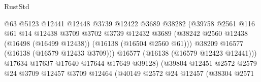 \begin{lexlean}{RustStd}
\begin{coremodule}
                                            @63
                                            @5123
                                            @12441
                                            @12448
                                            @3739
                                            @12422
                                            @3689
                                            @38282
                                            (@39758
                                              @2561
                                              @116
                                              @61
                                              @14
                                              @12438
                                              @3709
                                              @3702
                                              @3739
                                              @12432
                                              @3689
                                              (@38242
                                                @2560
                                                @12438
                                                (@16498 (@16499 @12438))
                                                (@16138 (@16504 @2560 @61)))
                                              @38209
                                              @16577
                                              (@16138 (@16579 @12433 @3709)))
                                            @16577
                                            (@16138 (@16579 @12423 @12441)))
                                          @17634
                                          @17637
                                          @17640
                                          @17644
                                          @17649
                                          @39128)
                                        (@39804
                                          @12451
                                          @2572
                                          @2579
                                          @24
                                          @3709
                                          @12457
                                          @3709
                                          @12464
                                          (@40149
                                            @2572
                                            @24
                                            @12457
                                            (@38304
                                              @2571

\end{coremodule}
\end{lexlean}
